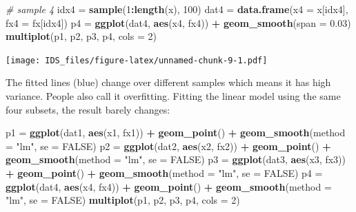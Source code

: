 \documentclass[12pt,]{krantz}
\makeatletter
\newenvironment{Shaded}{\begin{snugshade}}{\end{snugshade}}
\newcommand{\KeywordTok}[1]{\textcolor[rgb]{0.27,0.27,0.27}{\textbf{#1}}}
\newcommand{\DataTypeTok}[1]{\textcolor[rgb]{0.27,0.27,0.27}{#1}}
\newcommand{\DecValTok}[1]{\textcolor[rgb]{0.06,0.06,0.06}{#1}}
\newcommand{\FloatTok}[1]{\textcolor[rgb]{0.06,0.06,0.06}{#1}}
\newcommand{\StringTok}[1]{\textcolor[rgb]{0.5,0.5,0.5}{#1}}
\newcommand{\CommentTok}[1]{\textcolor[rgb]{0.37,0.37,0.37}{\textit{#1}}}
\newcommand{\OtherTok}[1]{\textcolor[rgb]{0.37,0.37,0.37}{#1}}
\newcommand{\OperatorTok}[1]{\textcolor[rgb]{0.43,0.43,0.43}{\textbf{#1}}}
\newcommand{\NormalTok}[1]{#1}
\newenvironment{kframe}{%
\medskip{}
\setlength{\fboxsep}{.8em}
 \def\at@end@of@kframe{}%
 \ifinner\ifhmode%
  \def\at@end@of@kframe{\end{minipage}}%
  \begin{minipage}{\columnwidth}%
 \fi\fi%
 \def\FrameCommand##1{\hskip\@totalleftmargin \hskip-\fboxsep
 \colorbox{shadecolor}{##1}\hskip-\fboxsep
     \hskip-\linewidth \hskip-\@totalleftmargin \hskip\columnwidth}%
 \MakeFramed {\advance\hsize-\width
   \@totalleftmargin\z@ \linewidth\hsize
   \@setminipage}}%
 {\par\unskip\endMakeFramed%
 \at@end@of@kframe}
\renewenvironment{Shaded}{\begin{kframe}}{\end{kframe}}
\theoremstyle{definition}
\theoremstyle{definition}
\theoremstyle{definition}
\theoremstyle{remark}
\makeatother
\begin{document}
\begin{Shaded}
\begin{Highlighting}[]
\CommentTok{# sample 4}
\NormalTok{idx4 =}\StringTok{ }\KeywordTok{sample}\NormalTok{(}\DecValTok{1}\OperatorTok{:}\KeywordTok{length}\NormalTok{(x), }\DecValTok{100}\NormalTok{)}
\NormalTok{dat4 =}\StringTok{ }\KeywordTok{data.frame}\NormalTok{(}\DataTypeTok{x4 =}\NormalTok{ x[idx4], }\DataTypeTok{fx4 =}\NormalTok{ fx[idx4])}
\NormalTok{p4 =}\StringTok{ }\KeywordTok{ggplot}\NormalTok{(dat4, }\KeywordTok{aes}\NormalTok{(x4, fx4)) }\OperatorTok{+}\StringTok{ }\KeywordTok{geom_smooth}\NormalTok{(}\DataTypeTok{span =} \FloatTok{0.03}\NormalTok{)}
\KeywordTok{multiplot}\NormalTok{(p1, p2, p3, p4, }\DataTypeTok{cols =} \DecValTok{2}\NormalTok{)}
\end{Highlighting}
\end{Shaded}

\texttt{[image: IDS\_files/figure-latex/unnamed-chunk-9-1.pdf]}

The fitted lines (blue) change over different samples which means it has
high variance. People also call it overfitting. Fitting the linear model
using the same four subsets, the result barely changes:

\begin{Shaded}
\begin{Highlighting}[]
\NormalTok{p1 =}\StringTok{ }\KeywordTok{ggplot}\NormalTok{(dat1, }\KeywordTok{aes}\NormalTok{(x1, fx1)) }\OperatorTok{+}\StringTok{ }\KeywordTok{geom_point}\NormalTok{() }\OperatorTok{+}\StringTok{ }\KeywordTok{geom_smooth}\NormalTok{(}\DataTypeTok{method =} \StringTok{"lm"}\NormalTok{, }
    \DataTypeTok{se =} \OtherTok{FALSE}\NormalTok{)}
\NormalTok{p2 =}\StringTok{ }\KeywordTok{ggplot}\NormalTok{(dat2, }\KeywordTok{aes}\NormalTok{(x2, fx2)) }\OperatorTok{+}\StringTok{ }\KeywordTok{geom_point}\NormalTok{() }\OperatorTok{+}\StringTok{ }\KeywordTok{geom_smooth}\NormalTok{(}\DataTypeTok{method =} \StringTok{"lm"}\NormalTok{, }
    \DataTypeTok{se =} \OtherTok{FALSE}\NormalTok{)}
\NormalTok{p3 =}\StringTok{ }\KeywordTok{ggplot}\NormalTok{(dat3, }\KeywordTok{aes}\NormalTok{(x3, fx3)) }\OperatorTok{+}\StringTok{ }\KeywordTok{geom_point}\NormalTok{() }\OperatorTok{+}\StringTok{ }\KeywordTok{geom_smooth}\NormalTok{(}\DataTypeTok{method =} \StringTok{"lm"}\NormalTok{, }
    \DataTypeTok{se =} \OtherTok{FALSE}\NormalTok{)}
\NormalTok{p4 =}\StringTok{ }\KeywordTok{ggplot}\NormalTok{(dat4, }\KeywordTok{aes}\NormalTok{(x4, fx4)) }\OperatorTok{+}\StringTok{ }\KeywordTok{geom_point}\NormalTok{() }\OperatorTok{+}\StringTok{ }\KeywordTok{geom_smooth}\NormalTok{(}\DataTypeTok{method =} \StringTok{"lm"}\NormalTok{, }
    \DataTypeTok{se =} \OtherTok{FALSE}\NormalTok{)}
\KeywordTok{multiplot}\NormalTok{(p1, p2, p3, p4, }\DataTypeTok{cols =} \DecValTok{2}\NormalTok{)}
\end{Highlighting}
\end{Shaded}
\end{document}
